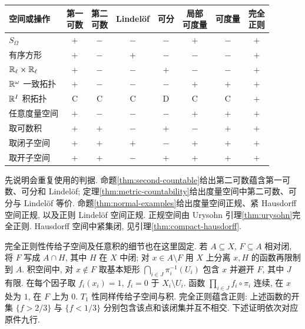 \begin{solution}
\begin{center}
\setlength{\tabcolsep}{4pt}
\begin{tabular}{lccccccc}
\hline
空间或操作 & \shortstack{第一\\可数} & \shortstack{第二\\可数} & Lindel\"of & 可分 & \shortstack{局部\\可度量} & 可度量 & \shortstack{完全\\正则}\\
\hline
$S_\Omega$ & $+$ & $-$ & $-$ & $-$ & $+$ & $-$ & $+$\\
有序方形 & $+$ & $-$ & $+$ & $-$ & $-$ & $-$ & $+$\\
$\mathbb R_\ell\times\mathbb R_\ell$ & $+$ & $-$ & $-$ & $+$ & $-$ & $-$ & $+$\\
$\mathbb R^\omega$ 一致拓扑 & $+$ & $-$ & $-$ & $-$ & $+$ & $+$ & $+$\\
$\mathbb R^I$ 积拓扑 & $\mathrm C$ & $\mathrm C$ & $\mathrm C$ & $\mathrm D$ & $\mathrm C$ & $\mathrm C$ & $+$\\
任意度量空间 & $+$ & $-$ & $-$ & $-$ & $+$ & $+$ & $+$\\
取可数积 & $+$ & $+$ & $-$ & $+$ & $-$ & $+$ & $+$\\
取闭子空间 & $+$ & $+$ & $+$ & $-$ & $+$ & $+$ & $+$\\
取开子空间 & $+$ & $+$ & $-$ & $+$ & $+$ & $+$ & $+$\\
\hline
\end{tabular}
\end{center}

先说明会重复使用的判据. 命题\ref{thm:second-countable}给出第二可数蕴含第一可数、可分和 Lindel\"of; 定理\ref{thm:metric-countability}给出度量空间中第二可数、可分与 Lindel\"of 等价. 命题\ref{thm:normal-examples}给出度量空间正规、紧 Hausdorff 空间正规, 以及正则 Lindel\"of 空间正规. 正规空间由 Urysohn 引理\ref{thm:urysohn}完全正则. Hausdorff 空间中紧集闭, 见引理\ref{thm:compact-hausdorff}.

完全正则性传给子空间及任意积的细节也在这里固定. 若 $A\subseteq X$, $F\subseteq A$ 相对闭, 将 $F$ 写成 $A\cap H$, 其中 $H$ 在 $X$ 中闭; 对 $x\in A\setminus F$ 用 $X$ 上分离 $x,H$ 的函数再限制到 $A$. 积空间中, 对 $x\notin F$ 取基本矩形 $\bigcap_{i\in J}\pi_i^{-1}(U_i)$ 包含 $x$ 并避开 $F$, 其中 $J$ 有限. 在每个因子取 $f_i(x_i)=1$, $f_i=0$ 于 $X_i\setminus U_i$. 函数 $\prod_{i\in J}f_i\circ\pi_i$ 连续, 在 $x$ 处为 $1$, 在 $F$ 上为 $0$. $T_1$ 性同样传给子空间与积. 完全正则蕴含正则: 上述函数的开集 $\{f>2/3\}$ 与 $\{f<1/3\}$ 分别包含该点和该闭集并互不相交. 下述证明依次对应原件九行.


\end{solution}
